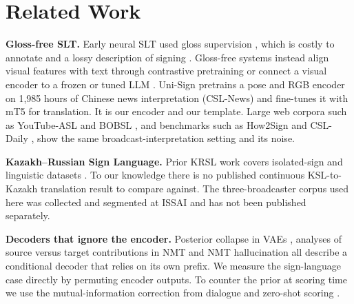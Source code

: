 \documentclass[11pt,twocolumn,a4paper]{article}
\renewcommand{\paragraph}[1]{\par\smallskip\noindent\textbf{#1}\hspace{0.5em}}
\begin{document}
\section{Related Work}

\paragraph{Gloss-free SLT.}
Early neural SLT used gloss supervision \citep{camgoz2018nslt,camgoz2020slt}, which is costly to annotate and a lossy description of signing \citep{muller2023considerations}. Gloss-free systems instead align visual features with text through contrastive pretraining \citep{zhou2023gfslt} or connect a visual encoder to a frozen or tuned LLM \citep{wong2024sign2gpt,gong2024signllm}. Uni-Sign \citep{li2025unisign} pretrains a pose and RGB encoder on 1{,}985 hours of Chinese news interpretation (CSL-News) and fine-tunes it with mT5 for translation. It is our encoder and our template. Large web corpora such as YouTube-ASL \citep{uthus2023youtubeasl} and BOBSL \citep{albanie2021bobsl}, and benchmarks such as How2Sign \citep{duarte2021how2sign} and CSL-Daily \citep{zhou2021csldaily}, show the same broadcast-interpretation setting and its noise.

\paragraph{Kazakh--Russian Sign Language.}
Prior KRSL work covers isolated-sign and linguistic datasets \citep{imashev2020krsl,mukushev2022krslonline}. To our knowledge there is no published continuous KSL-to-Kazakh translation result to compare against. The three-broadcaster corpus used here was collected and segmented at ISSAI and has not been published separately.

\paragraph{Decoders that ignore the encoder.}
Posterior collapse in VAEs \citep{bowman2016generating}, analyses of source versus target contributions in NMT \citep{voita2021analyzing} and NMT hallucination \citep{lee2018hallucinations} all describe a conditional decoder that relies on its own prefix. We measure the sign-language case directly by permuting encoder outputs. To counter the prior at scoring time we use the mutual-information correction from dialogue \citep{li2016mmi} and zero-shot scoring \citep{holtzman2021surface}.
\end{document}
